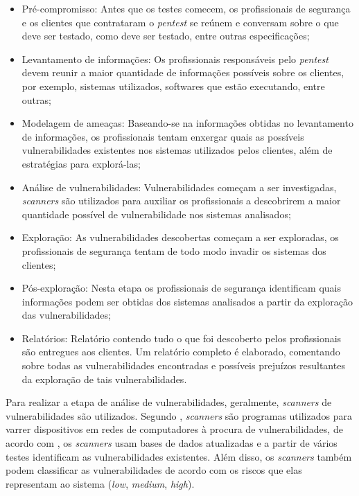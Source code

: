 \begin{itemize}
    \item Pré-compromisso: Antes que os testes comecem, os profissionais de segurança e os clientes que contrataram o \textit{\gls{pentest}} se reúnem e conversam sobre o que deve ser testado, como deve ser testado, entre outras especificações;  
    \item Levantamento de informações: Os profissionais responsáveis pelo \textit{\gls{pentest}} devem reunir a maior quantidade de informações possíveis sobre os clientes, por exemplo, sistemas utilizados, softwares que estão executando, entre outras;
    \item Modelagem de ameaças: Baseando-se na informações obtidas no levantamento de informações, os profissionais tentam enxergar quais as possíveis vulnerabilidades existentes nos sistemas utilizados pelos clientes, além de  estratégias para explorá-las;
    \item Análise de vulnerabilidades: Vulnerabilidades começam a ser investigadas, \textit{scanners} são utilizados para auxiliar os profissionais a descobrirem a maior quantidade possível de vulnerabilidade nos sistemas analisados;
    \item Exploração: As vulnerabilidades descobertas começam a ser exploradas, os profissionais de segurança tentam de todo modo invadir os sistemas dos clientes;
    \item Pós-exploração: Nesta etapa os profissionais de segurança identificam quais informações podem ser obtidas dos sistemas analisados a partir da exploração das vulnerabilidades;
    \item Relatórios: Relatório contendo tudo o que foi descoberto pelos profissionais são entregues aos clientes. Um relatório completo é elaborado, comentando sobre todas as vulnerabilidades encontradas e possíveis prejuízos resultantes da exploração de tais vulnerabilidades.
\end{itemize}

Para realizar a etapa de análise de vulnerabilidades, geralmente, \textit{scanners} de vulnerabilidades são utilizados. Segundo , \textit{scanners} são programas utilizados para varrer dispositivos em redes de computadores à procura de vulnerabilidades, de acordo com , os \textit{scanners} usam bases de dados atualizadas e a partir de vários testes identificam as vulnerabilidades existentes. Além disso, os \textit{scanners} também podem classificar as vulnerabilidades de acordo com os riscos que elas representam ao sistema (\textit{low}, \textit{medium}, \textit{high}).


